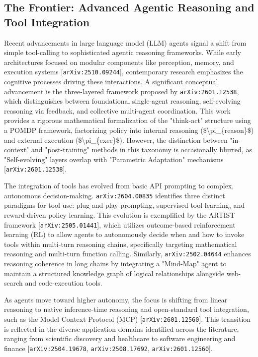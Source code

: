 \documentclass[11pt]{article}
\begin{document}
\subsection{The Frontier: Advanced Agentic Reasoning and Tool Integration}

Recent advancements in large language model (LLM) agents signal a shift from simple tool-calling to sophisticated agentic reasoning frameworks. While early architectures focused on modular components like perception, memory, and execution systems [\texttt{arXiv:2510.09244}], contemporary research emphasizes the cognitive processes driving these interactions. A significant conceptual advancement is the three-layered framework proposed by \texttt{arXiv:2601.12538}, which distinguishes between foundational single-agent reasoning, self-evolving reasoning via feedback, and collective multi-agent coordination. This work provides a rigorous mathematical formalization of the "think-act" structure using a POMDP framework, factorizing policy into internal reasoning (\$\textbackslash{}pi\_\{reason\}\$) and external execution (\$\textbackslash{}pi\_\{exec\}\$). However, the distinction between "in-context" and "post-training" methods in this taxonomy is occasionally blurred, as "Self-evolving" layers overlap with "Parametric Adaptation" mechanisms [\texttt{arXiv:2601.12538}].

The integration of tools has evolved from basic API prompting to complex, autonomous decision-making. \texttt{arXiv:2604.00835} identifies three distinct paradigms for tool use: plug-and-play prompting, supervised tool learning, and reward-driven policy learning. This evolution is exemplified by the ARTIST framework [\texttt{arXiv:2505.01441}], which utilizes outcome-based reinforcement learning (RL) to allow agents to autonomously decide when and how to invoke tools within multi-turn reasoning chains, specifically targeting mathematical reasoning and multi-turn function calling. Similarly, \texttt{arXiv:2502.04644} enhances reasoning coherence in long chains by integrating a "Mind-Map" agent to maintain a structured knowledge graph of logical relationships alongside web-search and code-execution tools.

As agents move toward higher autonomy, the focus is shifting from linear reasoning to native inference-time reasoning and open-standard tool integration, such as the Model Context Protocol (MCP) [\texttt{arXiv:2601.12560}]. This transition is reflected in the diverse application domains identified across the literature, ranging from scientific discovery and healthcare to software engineering and finance [\texttt{arXiv:2504.19678}, \texttt{arXiv:2508.17692}, \texttt{arXiv:2601.12560}].
\end{document}
